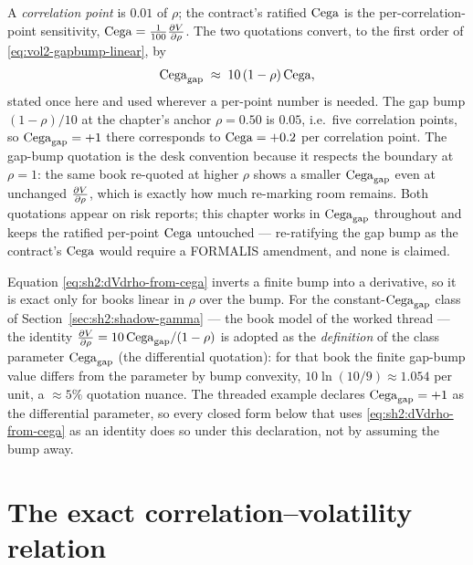 \begin{remark}
\label{rem:sh2:cega-units}
A \emph{correlation point} is $0.01$ of $\rho$; the contract's ratified
$\mathrm{Cega}$ is the per-correlation-point sensitivity,
$\mathrm{Cega} = \tfrac1{100}\frac{\partial V}{\partial \rho}$. The two quotations convert, to the
first order of \eqref{eq:vol2-gapbump-linear}, by
\begin{equation}\label{eq:sh2:cega-convert}
  \mathrm{Cega}_{\mathrm{gap}} \;\approx\; 10\,(1 - \rho)\, \mathrm{Cega},
\end{equation}
stated once here and used wherever a per-point number is needed. The gap
bump $(1-\rho)/10$ at the chapter's anchor $\rho = 0.50$ is $0.05$, i.e.\
five correlation points, so $\mathrm{Cega}_{\mathrm{gap}} = +1$ there corresponds to
$\mathrm{Cega} = +0.2$ per correlation point. The gap-bump quotation is the desk
convention because it respects the boundary at $\rho = 1$: the same book
re-quoted at higher $\rho$ shows a smaller $\mathrm{Cega}_{\mathrm{gap}}$ even at unchanged
$\frac{\partial V}{\partial \rho}$, which is exactly how much re-marking room remains. Both
quotations appear on risk reports; this chapter works in $\mathrm{Cega}_{\mathrm{gap}}$
throughout and keeps the ratified per-point $\mathrm{Cega}$ untouched ---
re-ratifying the gap bump as the contract's $\mathrm{Cega}$ would require a
FORMALIS amendment, and none is claimed.
\end{remark}

\begin{remark}[When the recovery \eqref{eq:sh2:dVdrho-from-cega} is exact]
\label{rem:sh2:cega-linear}
Equation \eqref{eq:sh2:dVdrho-from-cega} inverts a finite bump into a
derivative, so it is exact only for books linear in $\rho$ over the bump.
For the constant-$\mathrm{Cega}_{\mathrm{gap}}$ class of
Section~\ref{sec:sh2:shadow-gamma} --- the book model of the worked
thread --- the identity $\frac{\partial V}{\partial \rho} = 10\,\mathrm{Cega}_{\mathrm{gap}}/(1 - \rho)$ is
adopted as the \emph{definition} of the class parameter $\mathrm{Cega}_{\mathrm{gap}}$ (the
differential quotation): for that book the finite gap-bump value differs
from the parameter by bump convexity,
$10 \ln(10/9) \approx 1.054$ per unit, a $\approx 5\%$ quotation nuance.
The threaded example declares $\mathrm{Cega}_{\mathrm{gap}} = +1$ as the differential
parameter, so every closed form below that uses
\eqref{eq:sh2:dVdrho-from-cega} as an identity does so under this
declaration, not by assuming the bump away.
\end{remark}

\section{The exact correlation--volatility relation}\label{sec:sh2:exact}

